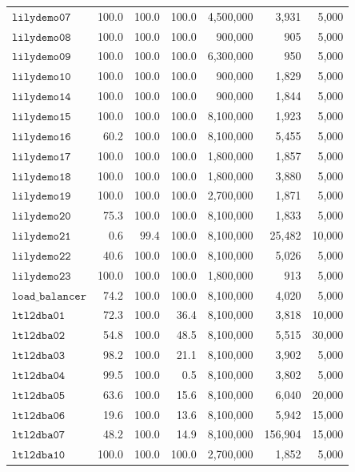 \begin{small}
\begin{longtable}{p{5cm}|rrr|rrr}
$\mathtt{lilydemo07}$ & 100.0 & 100.0 & 100.0 & 4,500,000 & 3,931 & 5,000 \\
$\mathtt{lilydemo08}$ & 100.0 & 100.0 & 100.0 & 900,000 & 905 & 5,000 \\
$\mathtt{lilydemo09}$ & 100.0 & 100.0 & 100.0 & 6,300,000 & 950 & 5,000 \\
$\mathtt{lilydemo10}$ & 100.0 & 100.0 & 100.0 & 900,000 & 1,829 & 5,000 \\
$\mathtt{lilydemo14}$ & 100.0 & 100.0 & 100.0 & 900,000 & 1,844 & 5,000 \\
$\mathtt{lilydemo15}$ & 100.0 & 100.0 & 100.0 & 8,100,000 & 1,923 & 5,000 \\
$\mathtt{lilydemo16}$ & 60.2 & 100.0 & 100.0 & 8,100,000 & 5,455 & 5,000 \\
$\mathtt{lilydemo17}$ & 100.0 & 100.0 & 100.0 & 1,800,000 & 1,857 & 5,000 \\
$\mathtt{lilydemo18}$ & 100.0 & 100.0 & 100.0 & 1,800,000 & 3,880 & 5,000 \\
$\mathtt{lilydemo19}$ & 100.0 & 100.0 & 100.0 & 2,700,000 & 1,871 & 5,000 \\
$\mathtt{lilydemo20}$ & 75.3 & 100.0 & 100.0 & 8,100,000 & 1,833 & 5,000 \\
$\mathtt{lilydemo21}$ & 0.6 & 99.4 & 100.0 & 8,100,000 & 25,482 & 10,000 \\
$\mathtt{lilydemo22}$ & 40.6 & 100.0 & 100.0 & 8,100,000 & 5,026 & 5,000 \\
$\mathtt{lilydemo23}$ & 100.0 & 100.0 & 100.0 & 1,800,000 & 913 & 5,000 \\
$\mathtt{load\_balancer}$ & 74.2 & 100.0 & 100.0 & 8,100,000 & 4,020 & 5,000 \\
$\mathtt{ltl2dba01}$ & 72.3 & 100.0 & 36.4 & 8,100,000 & 3,818 & 10,000 \\
$\mathtt{ltl2dba02}$ & 54.8 & 100.0 & 48.5 & 8,100,000 & 5,515 & 30,000 \\
$\mathtt{ltl2dba03}$ & 98.2 & 100.0 & 21.1 & 8,100,000 & 3,902 & 5,000 \\
$\mathtt{ltl2dba04}$ & 99.5 & 100.0 & 0.5 & 8,100,000 & 3,802 & 5,000 \\
$\mathtt{ltl2dba05}$ & 63.6 & 100.0 & 15.6 & 8,100,000 & 6,040 & 20,000 \\
$\mathtt{ltl2dba06}$ & 19.6 & 100.0 & 13.6 & 8,100,000 & 5,942 & 15,000 \\
$\mathtt{ltl2dba07}$ & 48.2 & 100.0 & 14.9 & 8,100,000 & 156,904 & 15,000 \\
$\mathtt{ltl2dba10}$ & 100.0 & 100.0 & 100.0 & 2,700,000 & 1,852 & 5,000 \\

\end{longtable}
\end{small}
